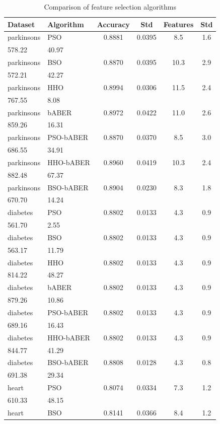 \begin{table}[htbp]
\centering
\caption{Comparison of feature selection algorithms}
\label{tab:comparison}
\begin{tabular}{llcccc}
\hline
Dataset & Algorithm & Accuracy & Std & Features & Std \\
\hline
parkinsons & PSO & 0.8881 & 0.0395 & 8.5 & 1.6 \\
578.22 & 40.97 \\
parkinsons & BSO & 0.8870 & 0.0395 & 10.3 & 2.9 \\
572.21 & 42.27 \\
parkinsons & HHO & 0.8994 & 0.0306 & 11.5 & 2.4 \\
767.55 & 8.08 \\
parkinsons & bABER & 0.8972 & 0.0422 & 11.0 & 2.6 \\
859.26 & 16.31 \\
parkinsons & PSO-bABER & 0.8870 & 0.0370 & 8.5 & 3.0 \\
686.55 & 34.91 \\
parkinsons & HHO-bABER & 0.8960 & 0.0419 & 10.3 & 2.4 \\
882.48 & 67.37 \\
parkinsons & BSO-bABER & 0.8904 & 0.0230 & 8.3 & 1.8 \\
670.70 & 14.24 \\
\hline
diabetes & PSO & 0.8802 & 0.0133 & 4.3 & 0.9 \\
561.70 & 2.55 \\
diabetes & BSO & 0.8802 & 0.0133 & 4.3 & 0.9 \\
563.17 & 11.79 \\
diabetes & HHO & 0.8802 & 0.0133 & 4.3 & 0.9 \\
814.22 & 48.27 \\
diabetes & bABER & 0.8802 & 0.0133 & 4.3 & 0.9 \\
879.26 & 10.86 \\
diabetes & PSO-bABER & 0.8802 & 0.0133 & 4.3 & 0.9 \\
689.16 & 16.43 \\
diabetes & HHO-bABER & 0.8802 & 0.0133 & 4.3 & 0.9 \\
844.77 & 41.29 \\
diabetes & BSO-bABER & 0.8808 & 0.0128 & 4.3 & 0.8 \\
691.38 & 29.34 \\
\hline
heart & PSO & 0.8074 & 0.0334 & 7.3 & 1.2 \\
610.33 & 48.15 \\
heart & BSO & 0.8141 & 0.0366 & 8.4 & 1.2 \\

\end{tabular}
\end{table}
